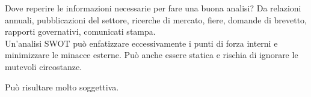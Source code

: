 \documentclass[a4paper,portrait,12pt]{article}
\theoremstyle{definition}
\begin{document}
Dove reperire le informazioni necessarie per fare una buona analisi?
Da relazioni annuali, pubblicazioni del settore, ricerche di mercato, fiere, domande di brevetto, rapporti governativi, comunicati stampa.\\

Un'analisi SWOT può enfatizzare eccessivamente i punti di forza interni e minimizzare le minacce esterne.
Può anche essere statica e rischia di ignorare le mutevoli circostanze.

Può risultare molto soggettiva.



%
%
%
%
%
%
\end{document}
